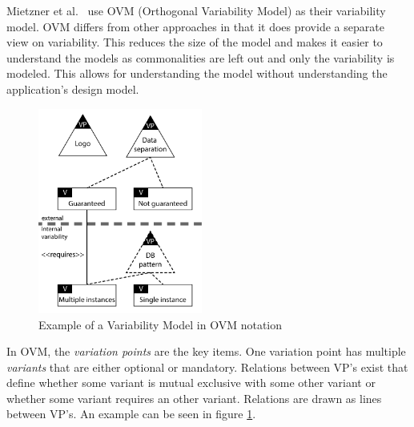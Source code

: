 Mietzner et al.~\cite{mietzner2009variability} use OVM (Orthogonal Variability Model) as their variability model. OVM differs from other approaches in that it does provide a separate view on variability. This reduces the size of the model and makes it easier to understand the models as commonalities are left out and only the variability is modeled. This allows for understanding the model without understanding the application's design model.

\begin{figure}[htr]
    \centering
    \includegraphics[width=0.48\textwidth]{assets/OVM}
    \caption{Example of a Variability Model in OVM notation}
    \label{fig:ovm}
\end{figure}

In OVM, the \textit{variation points} are the key items. One variation point has multiple \textit{variants} that are either optional or mandatory. Relations between VP's exist that define whether some variant is mutual exclusive with some other variant or whether some variant requires an other variant. Relations are drawn as lines between VP's. An example can be seen in figure \ref{fig:ovm}.


